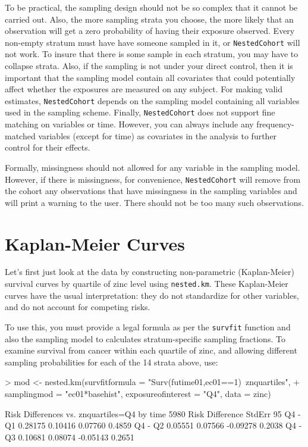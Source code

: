 \documentclass[10pt]{article}
\begin{document}
To be practical, the sampling design should not be so complex that it cannot be carried
out.  Also, the more sampling strata you choose, the more likely that an observation will
get a zero probability of having their exposure observed.  Every non-empty stratum must
have have someone sampled in it, or \texttt{NestedCohort} will not work.  To insure that
there is some sample in each stratum, you may have to collapse strata.  Also, if the
sampling is not under your direct control, then it is important that the sampling model
contain all covariates that could potentially affect whether the exposures are measured on
any subject.  For making valid estimates, \texttt{NestedCohort} depends on the sampling
model containing all variables used in the sampling scheme.  Finally,
\texttt{NestedCohort} does not support fine matching on variables or time.  However, you
can always include any frequency-matched variables (except for time) as covariates in the
analysis to further control for their effects.

Formally, missingness should not allowed for any variable in the sampling model.  However,
if there is missingness, for convenience, \texttt{NestedCohort} will remove from the
cohort any observations that have missingness in the sampling variables and will print a
warning to the user.  There should not be too many such observations.



\section{Kaplan-Meier Curves}
\label{sec:kaplan-meier-curves}

Let's first just look at the data by constructing non-parametric (Kaplan-Meier) survival
curves by quartile of zinc level using \texttt{nested.km}.  These Kaplan-Meier curves
have the usual interpretation: they do not standardize for other variables, and do not
account for competing risks.

To use this, you must provide a legal formula as per the \texttt{survfit} function and
also the sampling model to calculates stratum-specific sampling fractions.  To examine
survival from cancer within each quartile of zinc, and allowing different sampling
probabilities for each of the 14 strata above, use:

\begin{Schunk}
\begin{Sinput}
> mod <- nested.km(survfitformula = "Surv(futime01,ec01==1)~znquartiles", 
+     samplingmod = "ec01*basehist", exposureofinterest = "Q4", data = zinc)
\end{Sinput}
\begin{Soutput}
Risk Differences vs. znquartiles=Q4 by time 5980 
        Risk Difference  StdErr 95%
Q4 - Q1         0.28175 0.10416     0.07760       0.4859
Q4 - Q2         0.05551 0.07566    -0.09278       0.2038
Q4 - Q3         0.10681 0.08074    -0.05143       0.2651
\end{Soutput}
\end{Schunk}
\end{document}
